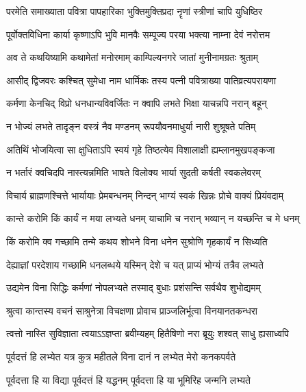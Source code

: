 
\twolineshloka
{परमेति समाख्याता पवित्रा पापहारिका}
{भुक्तिमुक्तिप्रदा नॄणां स्त्रीणां चापि युधिष्ठिर} %

\twolineshloka
{पूर्वोक्तविधिना कार्या कृष्णाऽपि भुवि मानवैः}
{सम्पूज्य परया भक्त्या नाम्ना देवं नरोत्तम} %

\twolineshloka
{अव ते कथयिष्यामि कथामेतां मनोरमाम्}
{काम्पिल्यनगरे जातां मुनीनामग्रतः श्रुताम्} %

\twolineshloka
{आसीद् द्विजवरः कश्चित् सुमेधा नाम धार्मिकः}
{तस्य पत्नी पवित्राख्या पातिव्रत्यपरायणा} %

\twolineshloka
{कर्मणा केनचिद् विप्रो धनधान्यविवर्जितः}
{न क्वापि लभते भिक्षा याचन्नपि नरान् बहून्} %

\twolineshloka
{न भोज्यं लभते तादृङ्न वस्त्रं नैव मण्डनम्}
{रूपयौवनमाधुर्या नारी शुश्रूषते पतिम्} %

\twolineshloka
{अतिथिं भोजयित्वा सा क्षुधिताऽपि स्वयं गृहे}
{तिष्ठत्येव विशालाक्षी ह्यम्लानमुखपङ्कजा} %

\twolineshloka
{न भर्तारं क्वचिदपि नास्त्यन्नमिति भाषते}
{विलोक्य भार्या सुदती कर्षती स्वकलेवरम्} %

\twolineshloka
{विचार्य ब्राह्मणश्चित्ते भार्यायाः प्रेमबन्धनम्}
{निन्दन् भाग्यं स्वकं खिन्नः प्रोचे वाक्यं प्रियंवदाम्} %

\twolineshloka
{कान्ते करोमि किं कार्यं न मया लभ्यते धनम्}
{याचामि च नरान् भव्यान् न यच्छन्ति च मे धनम्} %

\twolineshloka
{किं करोमि क्व गच्छामि तन्मे कथय शोभने}
{विना धनेन सुश्रोणि गृहकार्यं न सिध्यति} %

\twolineshloka
{देह्याज्ञां परदेशाय गच्छामि धनलब्धये}
{यस्मिन् देशे च यत् प्राप्यं भोग्यं तत्रैव लभ्यते} %

\twolineshloka
{उद्यमेन विना सिद्धिः कर्मणां नोपलभ्यते}
{तस्माद् बुधाः प्रशंसन्ति सर्वथैव शुभोद्यमम्} %

\twolineshloka
{श्रुत्वा कान्तस्य वचनं साश्रुनेत्रा विचक्षणा}
{प्रोवाच प्राञ्जलिर्भूत्वा विनयानतकन्धरा} %

\twolineshloka
{त्वत्तो नास्ति सुविज्ञाता त्वयाऽऽज्ञप्ता ब्रवीम्यहम्}
{हितैषिणो नरा ब्रूयुः शश्वत् साधु ह्यसाध्वपि} %

\twolineshloka
{पूर्वदत्तं हि लभ्येत यत्र कुत्र महीतले}
{विना दानं न लभ्येत मेरो कनकपर्वते} %

\twolineshloka
{पूर्वदत्ता हि या विद्या पूर्वदत्तं हि यद्धनम्}
{पूर्वदत्ता हि या भूमिरिह जन्मनि लभ्यते} %

